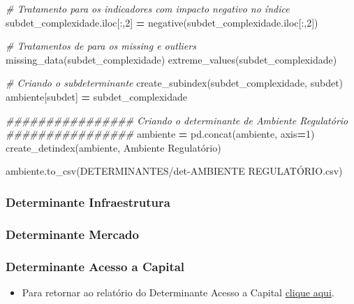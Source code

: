 \documentclass[
  12,
  dvipsnames]{article}
\newenvironment{Shaded}{\begin{snugshade}}{\end{snugshade}}
\newcommand{\CommentTok}[1]{\textcolor[rgb]{0.56,0.35,0.01}{\textit{#1}}}
\newcommand{\DecValTok}[1]{\textcolor[rgb]{0.00,0.00,0.81}{#1}}
\newcommand{\NormalTok}[1]{#1}
\newcommand{\OperatorTok}[1]{\textcolor[rgb]{0.81,0.36,0.00}{\textbf{#1}}}
\newcommand{\StringTok}[1]{\textcolor[rgb]{0.31,0.60,0.02}{#1}}
\providecommand{\tightlist}{%
  \setlength{\itemsep}{0pt}\setlength{\parskip}{0pt}}
\begin{document}
\begin{Shaded}
\begin{Highlighting}[]
\CommentTok{\# Tratamento para os indicadores com impacto negativo no índice}
\NormalTok{subdet\_complexidade.iloc[:,}\DecValTok{2}\NormalTok{] }\OperatorTok{=}\NormalTok{ negative(subdet\_complexidade.iloc[:,}\DecValTok{2}\NormalTok{])}

\CommentTok{\# Tratamentos de para os missing e outliers}
\NormalTok{missing\_data(subdet\_complexidade)}
\NormalTok{extreme\_values(subdet\_complexidade)}

\CommentTok{\# Criando o subdeterminante}
\NormalTok{create\_subindex(subdet\_complexidade, subdet)}
\NormalTok{ambiente[subdet] }\OperatorTok{=}\NormalTok{ subdet\_complexidade}

\CommentTok{\#\#\#\#\#\#\#\#\#\#\#\#\#\#\#\# Criando o determinante de Ambiente Regulatório \#\#\#\#\#\#\#\#\#\#\#\#\#\#\#\#}
\NormalTok{ambiente }\OperatorTok{=}\NormalTok{ pd.concat(ambiente, axis}\OperatorTok{=}\DecValTok{1}\NormalTok{)}
\NormalTok{create\_detindex(ambiente, }\StringTok{\textquotesingle{}Ambiente Regulatório\textquotesingle{}}\NormalTok{)}

\NormalTok{ambiente.to\_csv(}\StringTok{\textquotesingle{}DETERMINANTES/det{-}AMBIENTE REGULATÓRIO.csv\textquotesingle{}}\NormalTok{)}
\end{Highlighting}
\end{Shaded}

\hypertarget{script_2.2}{%
\subsubsection*{Determinante Infraestrutura}\label{script_2.2}}

\hypertarget{script_2.3}{%
\subsubsection*{Determinante Mercado}\label{script_2.3}}

\hypertarget{script_2.4}{%
\subsubsection*{Determinante Acesso a Capital}\label{script_2.4}}

\begin{itemize}
\tightlist
\item
  Para retornar ao relatório do Determinante Acesso a Capital
  \protect\hyperlink{det_acesso_capital}{clique aqui}.
\end{itemize}
\end{document}

